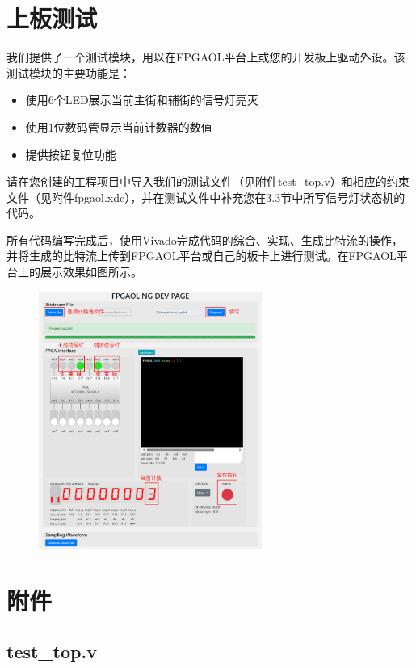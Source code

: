 \documentclass{ctexart}
\begin{document}

\section{上板测试}
我们提供了一个测试模块，用以在FPGAOL平台上或您的开发板上驱动外设。该测试模块的主要功能是：
\begin{itemize}
    \item 使用6个LED展示当前主街和辅街的信号灯亮灭
    \item 使用1位数码管显示当前计数器的数值
    \item 提供按钮复位功能
\end{itemize}

请在您创建的工程项目中导入我们的测试文件（见附件test\_top.v）和相应的约束文件（见附件fpgaol.xdc），并在测试文件中补充您在3.3节中所写信号灯状态机的代码。

所有代码编写完成后，使用Vivado完成代码的\underline{综合、实现、生成比特流}的操作，并将生成的比特流上传到FPGAOL平台或自己的板卡上进行测试。在FPGAOL平台上的展示效果如图所示。

\begin{figure}[H]
    \centering
    \includegraphics[width=0.65\textwidth]{lab2/12.png}
\end{figure}


\section{附件}

\subsection{test\_top.v}
\end{document}

